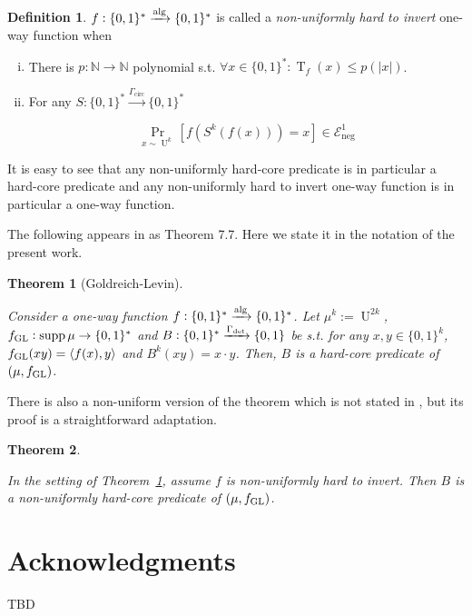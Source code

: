 \documentclass{article}
\numberwithin{equation}{section}
\theoremstyle{definition}
\newtheorem{definition}{Definition}[section]
\theoremstyle{plain}
\newtheorem{theorem}{Theorem}[section]
\newcommand{\Bool}{\{0,1\}}
\newcommand{\Words}{{\Bool^*}}
\newcommand{\WordsLen}[1]{{\Bool^{#1}}}
\DeclareMathOperator{\Supp}{supp}
\DeclareMathOperator{\Prb}{Pr}
\DeclareMathOperator{\T}{T}
\DeclareMathOperator{\U}{U}
\newcommand{\Nats}{\mathbb{N}}
\newcommand{\Abs}[1]{\lvert #1 \rvert}
\newcommand{\Chev}[1]{\langle #1 \rangle}
\newcommand{\Fall}{\mathcal{E}}
\newcommand{\Alg}{\xrightarrow{\textnormal{alg}}}
\begin{document}
\begin{samepage}
\begin{definition}

$f: \Words \Alg \Words$ is called a \emph{non-uniformly hard to invert} one-way function
when

\begin{enumerate}[(i)]

\item There is $p: \Nats \rightarrow \Nats$ polynomial s.t. $\forall x \in \Words: \T_f(x) \leq p(\Abs{x})$.

\item For any $S: \Words \xrightarrow{\Gamma_{\text{circ}}} \Words$

\begin{equation}
\Prb_{x \sim \U^k}[f(S^k(f(x)))=x] \in \Fall_{\text{neg}}^1
\end{equation}

\end{enumerate}

\end{definition}
\end{samepage}

It is easy to see that any non-uniformly hard-core predicate is in particular a hard-core predicate and any non-uniformly hard to invert one-way function is in particular a one-way function.

The following appears in \cite{Goldreich_2008} as Theorem 7.7. Here we state it in the notation of the present work.

\begin{theorem}[Goldreich-Levin]
\label{thm:goldreich_levin}

Consider a one-way function ${f: \Words \Alg \Words}$. Let $\mu^k:=\U^{2k}$, $f_{\textnormal{GL}}: \Supp \mu \rightarrow \Words$ and ${B: \Words \xrightarrow{\Gamma_{\textnormal{det}}} \Bool}$ be s.t. for any $x,y \in \WordsLen{k}$, $f_{\textnormal{GL}}(xy)=\Chev{f(x),y}$ and ${B^k(xy)=x \cdot y}$. Then, $B$ is a hard-core predicate of $(\mu, f_{\textnormal{GL}})$.

\end{theorem}

There is also a non-uniform version of the theorem which is not stated in \cite{Goldreich_2008}, but its proof is a straightforward adaptation.

\begin{theorem}
\label{thm:goldreich_levin_circ}

In the setting of Theorem~\ref{thm:goldreich_levin}, assume $f$ is non-uniformly hard to invert. Then $B$ is a non-uniformly hard-core predicate of $(\mu, f_{\textnormal{GL}})$.
\end{theorem}

\section*{Acknowledgments}

TBD



\end{document}
